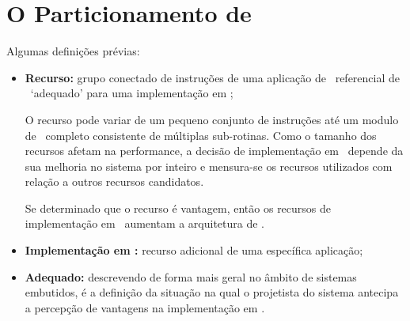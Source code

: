 \section{O Particionamento de \HS} \label{chap:desenvolvimento}



Algumas definições prévias:
	\begin{itemize}
    	\item \textbf{Recurso:} grupo conectado de instruções de uma aplicação de \design\ referencial de \software\ `adequado' para uma implementação em \hardware;

        O recurso pode variar de um pequeno conjunto de instruções até um modulo de \software\ completo consistente de múltiplas sub-rotinas. Como o tamanho dos recursos afetam na performance, a decisão de implementação em \hardware\ depende da sua melhoria no sistema por inteiro e mensura-se os recursos utilizados com relação a outros recursos candidatos.

        Se determinado que o recurso é vantagem, então os recursos de implementação em \hardware\ aumentam a arquitetura de \hardware.

        \item \textbf{Implementação em \hardware:} recurso adicional de uma específica aplicação;

        \item \textbf{Adequado:} descrevendo de forma mais geral no âmbito de sistemas embutidos, é a definição da situação na qual o projetista do sistema antecipa a percepção de vantagens na implementação em \hardware. %
    \end{itemize}

